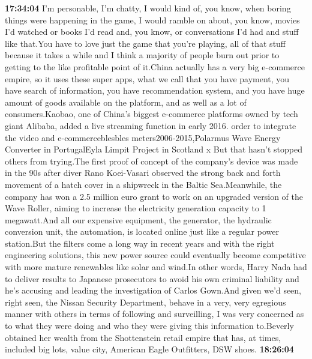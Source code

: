 \documentclass{article}%
\begin{document}
\textbf{17:34:04}%
\newline%
I'm personable, I'm chatty, I would kind of, you know, when boring things were happening in the game, I would ramble on about, you know, movies I'd watched or books I'd read and, you know, or conversations I'd had and stuff like that.You have to love just the game that you're playing, all of that stuff because it takes a while and I think a majority of people burn out prior to getting to the like profitable point of it.China actually has a very big e{-}commerce empire, so it uses these super apps, what we call that you have payment, you have search of information, you have recommendation system, and you have huge amount of goods available on the platform, and as well as a lot of consumers.Kaobao, one of China's biggest e{-}commerce platforms owned by tech giant Alibaba, added a live streaming function in early 2016. order to integrate the video and e{-}commerceblesbles    meters2006{-}2015,Polarmus Wave Energy Converter in PortugalEyla Limpit Project in Scotland x  But that hasn't stopped others from trying.The first proof of concept of the company's device was made in the 90s after diver Rano Koei{-}Vasari observed the strong back and forth movement of a hatch cover in a shipwreck in the Baltic Sea.Meanwhile, the company has won a 2.5 million euro grant to work on an upgraded version of the Wave Roller, aiming to increase the electricity generation capacity to 1 megawatt.And all our expensive equipment, the generator, the hydraulic conversion unit, the automation, is located online just like a regular power station.But the filters come a long way in recent years and with the right engineering solutions, this new power source could eventually become competitive with more mature renewables like solar and wind.In other words, Harry Nada had to deliver results to Japanese prosecutors to avoid his own criminal liability and he's accusing and leading the investigation of Carlos Gown.And given we'd seen, right seen, the Nissan Security Department, behave in a very, very egregious manner with others in terms of following and surveilling, I was very concerned as to what they were doing and who they were giving this information to.Beverly obtained her wealth from the Shottenstein retail empire that has, at times, included big lots, value city, American Eagle Outfitters, DSW shoes.%
\textbf{18:26:04}%
\newline%
\end{document}
